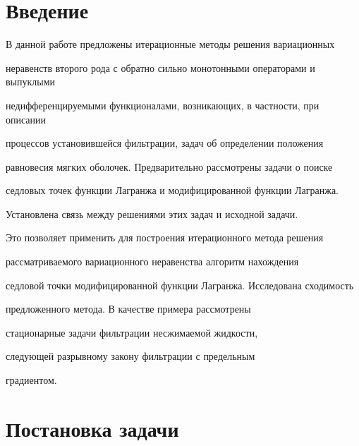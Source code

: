 

\maketitle


\label{begin}








\section*{Введение}





В данной работе предложены итерационные методы решения вариационных 


неравенств второго рода с обратно сильно монотонными операторами и выпуклыми 


недифференцируемыми функционалами, возникающих, в частности, при описании 


процессов установившейся фильтрации, задач об определении положения 


равновесия мягких оболочек. Предварительно рассмотрены задачи о поиске 


седловых точек функции Лагранжа и модифицированной функции Лагранжа.


Установлена связь между решениями этих задач и исходной задачи.


Это позволяет применить для построения итерационного метода решения 


рассматриваемого вариационного неравенства алгоритм нахождения 


седловой точки модифицированной функции Лагранжа. Исследована сходимость


предложенного метода. В качестве примера рассмотрены 


стационарные задачи фильтрации несжимаемой жидкости, 


следующей разрывному закону фильтрации с предельным 


градиентом. 





\section{Постановка задачи}





